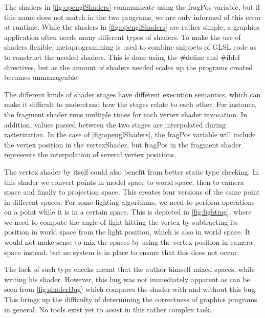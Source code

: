 The shaders in \cref{fig:openglShaders} communicate using the fragPos variable, but if this name does not match in the two programs, we are only informed of this error at runtime. 
While the shaders in \cref{fig:openglShaders} are rather simple, a graphics application often needs many different types of shaders.
To make the use of shaders flexible, metaprogramming is used to combine snippets of \gls{GLSL} code as to construct the needed shaders. 
This is done using the \#define and \#ifdef directives, but as the amount of shaders needed scales up the programs created becomes unmanageable.


The different kinds of shader stages have different execution semantics, which can make it difficult to understand how the stages relate to each other.
For instance, the fragment shader runs multiple times for each vertex shader invocation.
In addition, values passed between the two stages are interpolated during rasterization.
In the case of \cref{fig:openglShaders}, the fragPos variable will include the vertex position in the vertexShader, but fragPos in the fragment shader represents the interpolation of several vertex positions.


The vertex shader by itself could also benefit from better static type checking. In this shader we convert points in model space to world space, then to camera space and finally to projection space.
This creates four versions of the same point in different spaces.
For some lighting algorithms, we need to perform operations on a point while it is in a certain space. 
This is depicted in \cref{fig:lighting}, where we need to compute the angle of light hitting the vertex by subtracting its position in world space from the light position, which is also in world space. 
It would not make sense to mix the spaces by using the vertex position in camera space instead, but no system is in place to ensure that this does not occur.


The lack of such type checks meant that the author himself mixed spaces, while writing his shader.
However, this bug was not immediately apparent as can be seen from \cref{fig:shaderBug} which compares the shader with and without this bug.
This brings up the difficulty of determining the correctness of graphics programs in general.
No tools exist yet to assist in this rather complex task. 
 
